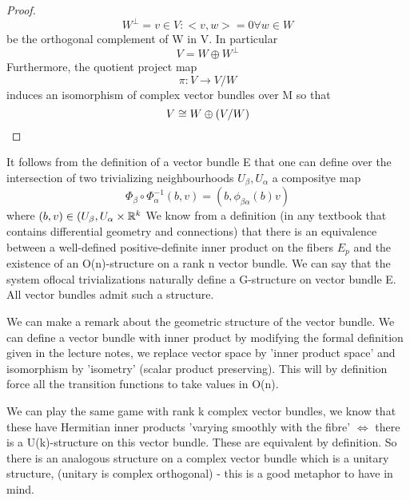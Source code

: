 \begin{proof}
\begin{equation*}
 W^{\perp} = {v \in V: <v,w> = 0 \forall w \in W}
\end{equation*}
be the orthogonal complement of W in V. In particular 
\begin{equation*}
 V = W \oplus W^{\perp}
\end{equation*}
Furthermore, the quotient project map 
\begin{equation*}
 \pi: V \to V/W
\end{equation*}
induces an isomorphism of complex vector bundles over M  so that 
\begin{equation*}
 V \cong W \oplus (V/W)
\end{equation*}
\end{proof}
It follows from the definition of a vector bundle E that one can define over the intersection of two trivializing neighbourhoods
$U_\beta, U_\alpha$ a compositye map
$$\Phi_\beta \circ \Phi^{-1}_{\alpha}(b,v) = (b, \phi_{\beta \alpha}(b)v) $$
where $(b,v) \in (U_\beta, U_\alpha \times \mathbb{R}^k$
   We know from a definition (in any textbook that contains differential geometry and connections) that there is an equivalence
between a well-defined positive-definite inner product on the fibers $E_p$ and the existence of an O(n)-structure on a rank
n vector bundle. We can say that the system oflocal trivializations naturally define a G-structure on vector bundle E. 
All vector bundles admit such a structure. 
  \begin{rem}
   We can make a remark about the geometric structure of the vector bundle. We can define a vector bundle with inner 
product by modifying the formal definition given in the lecture notes, we replace vector space by 'inner product space' and 
isomorphism by 'isometry' (scalar product preserving). This will by definition force all the transition functions to take values
in O(n).
  \end{rem}
We can play the same game with rank k complex vector bundles, we know that these have Hermitian inner products 'varying smoothly 
with the fibre' $\iff$ there is a U(k)-structure on this vector bundle.
   These are equivalent by definition. So there is an analogous structure on a complex vector bundle which is a unitary structure, 
(unitary is complex orthogonal) - this is a good metaphor to have in mind. 